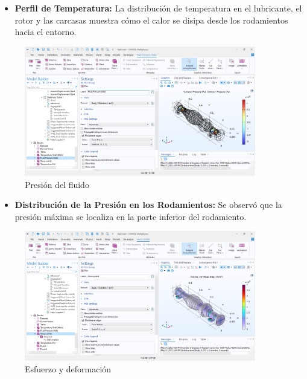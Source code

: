 \documentclass{article}
\theoremstyle{mytheoremstyle}
\theoremstyle{mytheoremstyle}
\theoremstyle{myproblemstyle}
\begin{document}
            \begin{itemize}
              \item \textbf{Perfil de Temperatura:} La distribución de temperatura en el lubricante, el rotor y las carcasas muestra cómo el calor se disipa desde los rodamientos hacia el entorno.
               \end{itemize}
            \begin{figure}[H]
              \centering
              \includegraphics[width=0.9\textwidth]{fluid_pressure.png}
              \caption{Presión del fluido}
              \label{fig:comsol_presion_fluido}
            \end{figure}

            \begin{itemize}
             \item \textbf{Distribución de la Presión en los Rodamientos:} Se observó que la presión máxima se localiza en la parte inferior del rodamiento.
               \end{itemize}
             \begin{figure}[H]
              \centering
              \includegraphics[width=0.9\textwidth]{Stress+Deformation.png}
              \caption{Esfuerzo y deformación}
              \label{fig:comsol_esfuerzo_deformacion}
            \end{figure}
\end{document}
